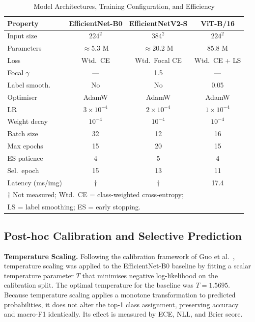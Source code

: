 \documentclass[conference]{IEEEtran}
\begin{document}
\begin{table}[t]
\caption{Model Architectures, Training Configuration, and Efficiency}
\label{tab:architecture}
\centering
\setlength{\tabcolsep}{4pt}
\begin{tabular}{lccc}
\toprule
\textbf{Property} & \textbf{EfficientNet-B0} & \textbf{EfficientNetV2-S} & \textbf{ViT-B/16} \\
\midrule
Input size & $224^2$ & $384^2$ & $224^2$ \\
Parameters & $\approx$5.3 M & $\approx$20.2 M & 85.8 M \\
Loss & Wtd.\ CE & Wtd.\ Focal CE & Wtd.\ CE + LS \\
Focal $\gamma$ & --- & 1.5 & --- \\
Label smooth. & No & No & 0.05 \\
Optimiser & AdamW & AdamW & AdamW \\
LR & $3\!\times\!10^{-4}$ & $2\!\times\!10^{-4}$ & $1\!\times\!10^{-4}$ \\
Weight decay & $10^{-4}$ & $10^{-4}$ & $10^{-4}$ \\
Batch size & 32 & 12 & 16 \\
Max epochs & 15 & 20 & 15 \\
ES patience & 4 & 5 & 4 \\
Sel.\ epoch & 15 & 13 & 11 \\
Latency (ms/img) & $\dagger$ & $\dagger$ & 17.4 \\
\bottomrule
\multicolumn{4}{l}{\small $\dagger$ Not measured; \small Wtd.\ CE = class-weighted cross-entropy;} \\
\multicolumn{4}{l}{\small LS = label smoothing; ES = early stopping.} \\
\end{tabular}
\end{table}

\subsection{Post-hoc Calibration and Selective Prediction}

\textbf{Temperature Scaling.}
Following the calibration framework of Guo et al.~\cite{guo2017calibration},
temperature scaling was applied to the EfficientNet-B0 baseline by fitting a
scalar temperature parameter $T$ that minimises negative log-likelihood on the
calibration split. The optimal temperature for the baseline was $T=1.5695$.
Because temperature scaling applies a monotone transformation to predicted
probabilities, it does not alter the top-1 class assignment, preserving
accuracy and macro-F1 identically. Its effect is measured by ECE, NLL, and
Brier score.
\end{document}
